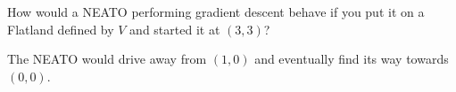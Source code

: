How would a NEATO performing gradient descent behave if you put it on a Flatland defined by $V$ and started it at $(3, 3)$?

\begin{solution}
    The NEATO would drive away from  $(1, 0)$ and eventually find its way towards $(0, 0)$.
\end{solution}